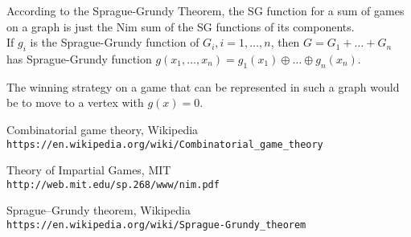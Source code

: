 \documentclass{article}
\begin{document}
According to the Sprague-Grundy Theorem, the SG function for a sum of games on a graph is just the Nim sum of the SG functions of its components.\\
If $g_i$ is the Sprague-Grundy function of $G_i, i = 1, \dots, n$, then $G = G_1 + \dots + G_n$ has Sprague-Grundy function $g(x_1, \dots, x_n) = g_1(x_1) \oplus \dots \oplus g_n(x_n)$.

The winning strategy on a game that can be represented in such a graph would be to move to a vertex with $g(x) = 0$.

\begin{thebibliography}{9}

Combinatorial game theory, Wikipedia
\\\texttt{https://en.wikipedia.org/wiki/Combinatorial{\_}game{\_}theory}

Theory of Impartial Games, MIT
\\\texttt{http://web.mit.edu/sp.268/www/nim.pdf}

Sprague–Grundy theorem, Wikipedia
\\\texttt{https://en.wikipedia.org/wiki/Sprague-Grundy{\_}theorem}

\end{thebibliography}
\end{document}

